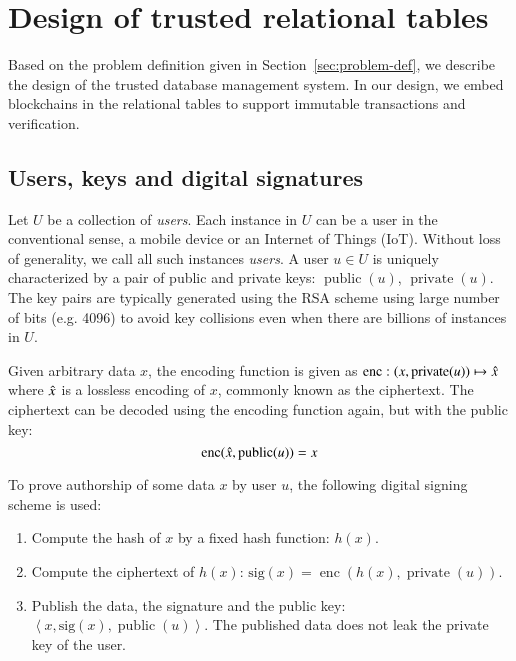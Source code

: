 \section{Design of trusted relational tables}
\label{sec:trusted-db}

Based on the problem definition given in 
Section~\ref{sec:problem-def}, we describe the design of the trusted database
management system.  In our design, we embed blockchains in the relational
tables to support immutable transactions and verification.

\subsection{Users, keys and digital signatures}

\newcommand{\public}{\operatorname{public}}
\newcommand{\private}{\operatorname{private}}
\newcommand{\enc}{\operatorname{enc}}

Let $U$ be a collection of {\em users}.  Each instance in $U$ can be a user in
the conventional sense, a mobile device or an Internet of Things (IoT).
Without loss of generality, we call all such instances {\em users}.  A
user $u\in U$ is uniquely characterized by a pair of public and private keys:
$\public(u)$, $\private(u)$.  The key pairs are typically generated
using the RSA scheme \cite{cormen2009introduction} using large number
of bits (e.g. 4096) to avoid key collisions
even when there are billions of instances in $U$.

Given arbitrary data $x$, the encoding function is given as
$\enc: (x,\private(u))\mapsto \Hat{x}$ where $\Hat{x}$ is a lossless encoding
of $x$, commonly known as the ciphertext.  The ciphertext can be decoded using
the encoding function again, but with the public key:
$$ \enc(\Hat{x}, \public(u)) = x $$

To prove authorship of some data $x$ by user $u$, the following digital signing
scheme is used:

\begin{enumerate}
    \item Compute the hash of $x$ by a fixed hash function: $h(x)$.
    \item Compute the ciphertext of $h(x)$: $\mathrm{sig}(x) = \enc(h(x),
        \private(u))$.
    \item Publish the data, the signature and the public key:
        $\left<x, \mathrm{sig}(x), \public(u)\right>$.
        The published data does not leak the private key of the user.
\end{enumerate}

